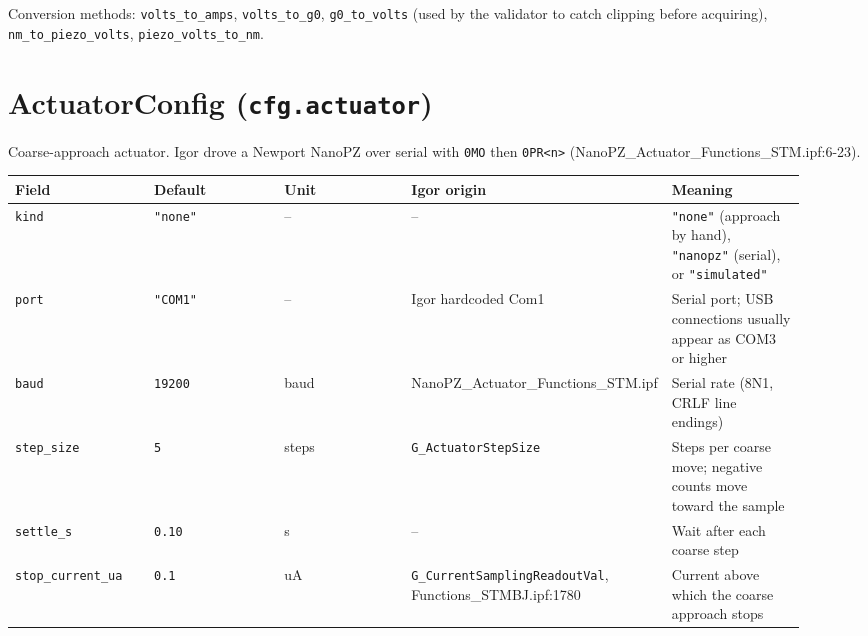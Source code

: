 Conversion methods: \texttt{volts\_\discretionary{}{}{}to\_\discretionary{}{}{}amps}, \texttt{volts\_\discretionary{}{}{}to\_\discretionary{}{}{}g0}, \texttt{g0\_\discretionary{}{}{}to\_\discretionary{}{}{}volts} (used by the validator to catch clipping before acquiring), \texttt{nm\_\discretionary{}{}{}to\_\discretionary{}{}{}piezo\_\discretionary{}{}{}volts}, \texttt{piezo\_\discretionary{}{}{}volts\_\discretionary{}{}{}to\_\discretionary{}{}{}nm}.

\section{ActuatorConfig (\texttt{cfg.\discretionary{}{}{}actuator})}

Coarse-approach actuator. Igor drove a Newport NanoPZ over serial with \texttt{0MO} then \texttt{0PR<n>} (NanoPZ\_Actuator\_Functions\_STM.ipf:6-23).

\footnotesize\setlength{\LTleft}{0pt}\setlength{\LTright}{\fill}
\begin{longtable}{@{}>{\raggedright\arraybackslash}p{0.184\linewidth}>{\raggedright\arraybackslash}p{0.184\linewidth}>{\raggedright\arraybackslash}p{0.184\linewidth}>{\raggedright\arraybackslash}p{0.184\linewidth}>{\raggedright\arraybackslash}p{0.184\linewidth}@{}}
\toprule
\textbf{Field} & \textbf{Default} & \textbf{Unit} & \textbf{Igor origin} & \textbf{Meaning} \\
\midrule\endhead
\texttt{kind} & \texttt{"none"} & -- & -- & \texttt{"none"} (approach by hand), \texttt{"nanopz"} (serial), or \texttt{"simulated"} \\
\texttt{port} & \texttt{"COM1"} & -- & Igor hardcoded Com1 & Serial port; USB connections usually appear as COM3 or higher \\
\texttt{baud} & \texttt{19200} & baud & NanoPZ\_Actuator\_Functions\_STM.ipf & Serial rate (8N1, CRLF line endings) \\
\texttt{step\_\discretionary{}{}{}size} & \texttt{5} & steps & \texttt{G\_\discretionary{}{}{}Actuator\discretionary{}{}{}Step\discretionary{}{}{}Size} & Steps per coarse move; negative counts move toward the sample \\
\texttt{settle\_\discretionary{}{}{}s} & \texttt{0.\discretionary{}{}{}10} & s & -- & Wait after each coarse step \\
\texttt{stop\_\discretionary{}{}{}current\_\discretionary{}{}{}ua} & \texttt{0.\discretionary{}{}{}1} & uA & \texttt{G\_\discretionary{}{}{}Current\discretionary{}{}{}Sampling\discretionary{}{}{}Readout\discretionary{}{}{}Val}, Functions\_STMBJ.ipf:1780 & Current above which the coarse approach stops \\
\bottomrule
\end{longtable}
\normalsize

